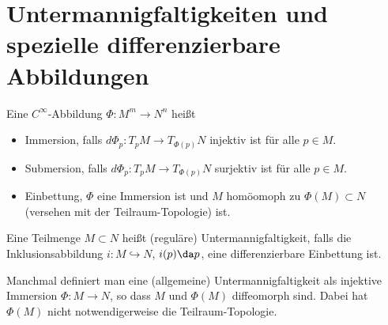\documentclass[a4paper,twoside,DIV15,BCOR12mm]{scrbook}
\begin{document}
\section{Untermannigfaltigkeiten und spezielle differenzierbare Abbildungen}

Eine $C^\infty$-Abbildung $\Phi:M^m\to N^n$ heißt 
\begin{itemize}
\item Immersion, falls $d\Phi_p: T_pM \to T_{\Phi(p)}N$ injektiv ist für alle $p\in M$.
\item Submersion, falls $d\Phi_p: T_pM \to T_{\Phi(p)}N$ surjektiv ist für alle $p\in M$.
\item Einbettung, $\Phi$ eine Immersion ist und $M$ homöomoph zu $\Phi(M)\subset N$ (versehen mit der Teilraum-Topologie) ist. 
\end{itemize}

Eine Teilmenge $M\subset N$ heißt (reguläre) Untermannigfaltigkeit, falls die Inklusionsabbildung $i:M\hookrightarrow N$, $i(p) \da p$, eine differenzierbare Einbettung ist.

Manchmal definiert man eine (allgemeine) Untermannigfaltigkeit als injektive Immersion $\Phi:M\to N$, so dass $M$ und $\Phi(M)$ diffeomorph sind. Dabei hat $\Phi(M)$ nicht notwendigerweise die Teilraum-Topologie.
\end{document}
